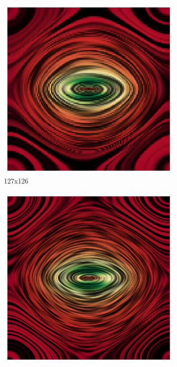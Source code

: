 \documentclass{article}
\begin{document}
\begin{figure}[h!]
    \centering
    \begin{subfigure}{0.32\textwidth}
        \centering
        \includegraphics[width=\textwidth]{metsim_original.png}
        \caption{127x126}
    \end{subfigure}
    \hfill
    \begin{subfigure}{0.32\textwidth}
        \centering
        \includegraphics[width=\textwidth]{metsim_250_250.png}

\end{subfigure}
\end{figure}
\end{document}
